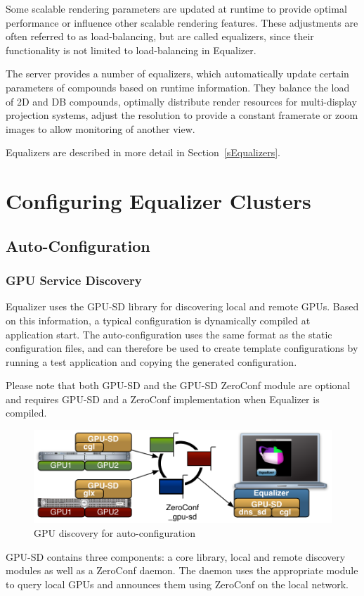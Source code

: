 \documentclass[10pt,a4]{scrartcl}
\newcommand{\sref}[1]{Section~\ref{#1}}
\begin{document}
Some scalable rendering parameters are updated at runtime to provide
optimal performance or influence other scalable rendering
features. These adjustments are often referred to as load-balancing, but
are called \textsf{equalizers}, since their functionality is not limited
to load-balancing in Equalizer.

The server provides a number of equalizers, which automatically update
certain parameters of compounds based on runtime information. They
balance the load of 2D and DB compounds, optimally distribute render
resources for multi-display projection systems, adjust the resolution
to provide a constant framerate or zoom images to allow monitoring of
another view.

Equalizers are described in more detail in \sref{sEqualizers}.


\section{\label{sConfig}Configuring Equalizer Clusters}

\subsection{\label{sAutoConfig}Auto-Configuration}

\subsubsection{GPU Service Discovery}
Equalizer uses the GPU-SD library for discovering local and remote GPUs. Based
on this information, a typical configuration is dynamically compiled at
application start. The auto-configuration uses the same format as the static
configuration files, and can therefore be used to create template configurations
by running a test application and copying the generated configuration.

Please note that both GPU-SD and the GPU-SD ZeroConf module are optional and
requires GPU-SD and a ZeroConf implementation when Equalizer is compiled.

\begin{figure}
  \includegraphics[width=.618\textwidth]{images/gpu-sd.pdf}
  {\caption{\label{fGPUSD}GPU discovery for auto-configuration}}
\end{figure}
GPU-SD contains three components: a core library, local and remote discovery
modules as well as a ZeroConf daemon. The daemon uses the appropriate module to
query local GPUs and announces them using ZeroConf on the local network.
\end{document}
